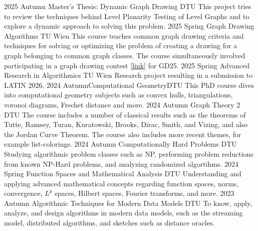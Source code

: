 \documentclass[9pt]{developercv} %
\begin{document}
\begin{entrylist}
	\entry%
		{2025 Autumn}
		{Master's Thesis: Dynamic Graph Drawing}
		{DTU}
		{This project tries to review the techniques behind Level Planarity Testing of Level Graphs and to explore a dynamic approach to solving this problem.}
	\entry%
		{2025 Spring}
		{Graph Drawing Algorithms}
		{TU Wien}
		{This course teaches common graph drawing criteria and techniques for solving or optimizing the problem of creating a drawing for a graph belonging to common graph classes. The course simultaneously involved participating in a graph drawing contest \href{https://mozart.diei.unipg.it/gdcontest/2025/live/}{[link]} for GD25.}
	\entry%
		{2025 Spring}
		{Advanced Research in Algorithmics}
		{TU Wien}
		{Research project resulting in a submission to LATIN 2026.}
	\entry%
		{2024 Autumn}{Computational Geometry}{DTU}
		{This PhD course dives into computational geometry subjects such as convex hulls, triangulations, voronoi diagrams, Frechet distance and more. }
	\entry%
        {2024 Autumn} 
        {Graph Theory 2}
        {DTU}
        {The course includes a number of classical results such as the theorems of Tutte, Ramsey, Turan, Kuratowski, Brooks, Dirac, Smith, and Vizing, and also the Jordan Curve Theorem. The course also includes more recent themes, for example list-colorings. }
	\entry%
		{2024 Autumn}
		{Computationally Hard Problems}
		{DTU}
		{Studying algorithmic problem classes such as NP, performing problem reductions from known NP-Hard problems, and analyzing randomized algortihms.}
	\entry%
		{2024 Spring}
		{Function Spaces and Mathematical Analysis}
		{DTU}
		{Understanding and applying advanced mathematical concepts regarding function spaces, norms, convergence, $L^p$ spaces, Hilbert spaces, Fourier transforms, and more. }
	\entry%
        {2023 Autumn} 
        {Algorithmic Techniques for Modern Data Models}
        {DTU}
        {To know, apply, analyze, and design algorithms in modern data models, such as the streaming model, distributed algorithms, and sketches such as distance oracles.}

\end{entrylist}
\end{document}
